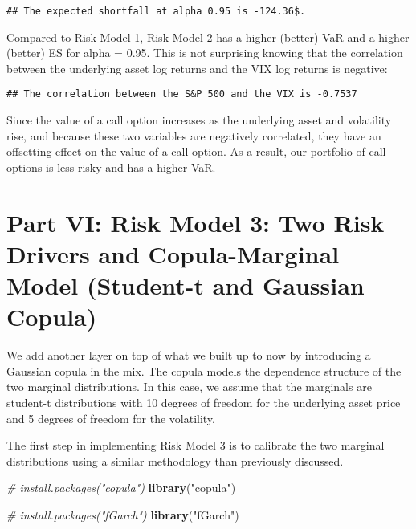 \documentclass[]{article}
\newenvironment{Shaded}{\begin{snugshade}}{\end{snugshade}}
\newcommand{\CommentTok}[1]{\textcolor[rgb]{0.56,0.35,0.01}{\textit{#1}}}
\newcommand{\KeywordTok}[1]{\textcolor[rgb]{0.13,0.29,0.53}{\textbf{#1}}}
\newcommand{\NormalTok}[1]{#1}
\newcommand{\StringTok}[1]{\textcolor[rgb]{0.31,0.60,0.02}{#1}}
\begin{document}
\begin{verbatim}
## The expected shortfall at alpha 0.95 is -124.36$.
\end{verbatim}

Compared to Risk Model 1, Risk Model 2 has a higher (better) VaR and a
higher (better) ES for alpha = 0.95. This is not surprising knowing that
the correlation between the underlying asset log returns and the VIX log
returns is negative:

\begin{verbatim}
## The correlation between the S&P 500 and the VIX is -0.7537
\end{verbatim}

Since the value of a call option increases as the underlying asset and
volatility rise, and because these two variables are negatively
correlated, they have an offsetting effect on the value of a call
option. As a result, our portfolio of call options is less risky and has
a higher VaR.

\hypertarget{part-vi-risk-model-3-two-risk-drivers-and-copula-marginal-model-student-t-and-gaussian-copula}{%
\section{Part VI: Risk Model 3: Two Risk Drivers and Copula-Marginal
Model (Student-t and Gaussian
Copula)}\label{part-vi-risk-model-3-two-risk-drivers-and-copula-marginal-model-student-t-and-gaussian-copula}}

We add another layer on top of what we built up to now by introducing a
Gaussian copula in the mix. The copula models the dependence structure
of the two marginal distributions. In this case, we assume that the
marginals are student-t distributions with 10 degrees of freedom for the
underlying asset price and 5 degrees of freedom for the volatility.

The first step in implementing Risk Model 3 is to calibrate the two
marginal distributions using a similar methodology than previously
discussed.

\begin{Shaded}
\begin{Highlighting}[]
\CommentTok{\# install.packages("copula")}
\KeywordTok{library}\NormalTok{(}\StringTok{"copula"}\NormalTok{)}

\CommentTok{\# install.packages("fGarch")}
\KeywordTok{library}\NormalTok{(}\StringTok{"fGarch"}\NormalTok{)}
\end{Highlighting}
\end{Shaded}
\end{document}
